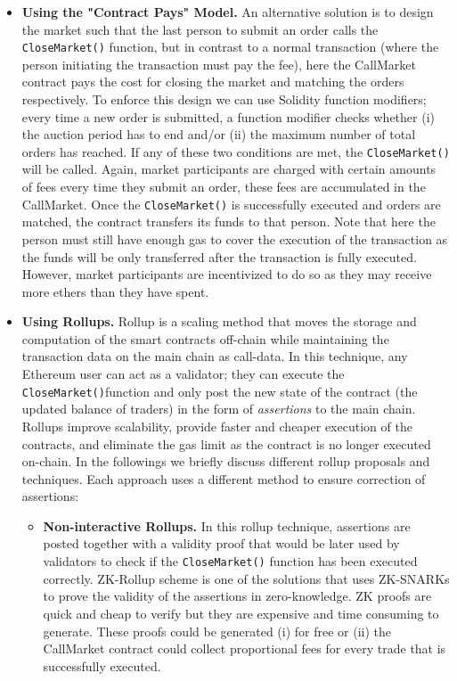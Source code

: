 \begin{itemize}
\begin{itemize}

\item \textbf{Using the "Contract Pays" Model.} An alternative solution is to design the market such that the last person to submit an order calls the \texttt{CloseMarket()} function, but in contrast to a normal transaction (where the person initiating the transaction must pay the fee), here the CallMarket contract pays the cost for closing the market and matching the orders respectively. To enforce this design we can use Solidity function modifiers; every time a new order is submitted, a function modifier checks whether (i) the auction period has to end and/or (ii) the maximum number of total orders has reached. If any of these two conditions are met, the \texttt{CloseMarket()} will be called. Again, market participants are charged with certain amounts of fees every time they submit an order, these fees are accumulated in the CallMarket. Once the \texttt{CloseMarket()} is successfully executed and orders are matched, the contract transfers its funds to that person. Note that here the person must still have enough gas to cover the execution of the transaction as the funds will be only transferred after the transaction is fully executed. However, market participants are incentivized to do so as they may receive more ethers than they have spent.


\item \textbf{Using Rollups.} Rollup is a scaling method that moves the storage and computation of the smart contracts off-chain while maintaining the transaction data on the main chain as call-data. In this technique, any Ethereum user can act as a validator; they can execute the \texttt{CloseMarket()}function and only post the new state of the contract (the updated balance of traders) in the form of \textit{assertions} to the main chain. Rollups improve scalability, provide faster and cheaper execution of the contracts, and eliminate the gas limit as the contract is no longer executed on-chain.
In the followings we briefly discuss different rollup proposals and techniques. Each approach uses a different method to ensure correction of assertions:


\begin{itemize}

\item \textbf{{Non-interactive Rollups.}} In this rollup technique, assertions are posted together with a validity proof that would be later used by validators to check if the \texttt{CloseMarket()} function has been executed correctly. ZK-Rollup scheme is one of the solutions that uses ZK-SNARKs to prove the validity of the assertions in zero-knowledge. ZK proofs are quick and cheap to verify but they are expensive and time consuming to generate. These proofs could be generated (i) for free or (ii) the CallMarket contract could collect proportional fees for every trade that is successfully executed.


\end{itemize}
\end{itemize}
\end{itemize}
